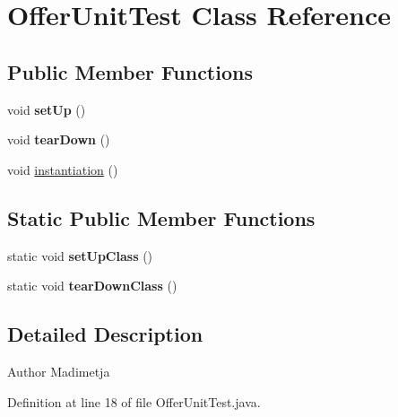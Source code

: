 \hypertarget{class_offer_unit_test}{\section{Offer\+Unit\+Test Class Reference}
\label{class_offer_unit_test}
}
\subsection*{Public Member Functions}
\begin{DoxyCompactItemize}
\item 
\hypertarget{class_offer_unit_test_a491087ff4d8fd6bad517f3e65c6a2c1a}{void {\bfseries set\+Up} ()}\label{class_offer_unit_test_a491087ff4d8fd6bad517f3e65c6a2c1a}

\item 
\hypertarget{class_offer_unit_test_a8e3f348a59b90790bb602bafbe7e2c0d}{void {\bfseries tear\+Down} ()}\label{class_offer_unit_test_a8e3f348a59b90790bb602bafbe7e2c0d}

\item 
void \hyperlink{class_offer_unit_test_a6a183dfb778383f20231c0dd4a43dc65}{instantiation} ()
\end{DoxyCompactItemize}
\subsection*{Static Public Member Functions}
\begin{DoxyCompactItemize}
\item 
\hypertarget{class_offer_unit_test_a814f87470fbd7747577a8d21a1e31374}{static void {\bfseries set\+Up\+Class} ()}\label{class_offer_unit_test_a814f87470fbd7747577a8d21a1e31374}

\item 
\hypertarget{class_offer_unit_test_afcf0203b47fec4b0899c2e53f2a1a4dc}{static void {\bfseries tear\+Down\+Class} ()}\label{class_offer_unit_test_afcf0203b47fec4b0899c2e53f2a1a4dc}

\end{DoxyCompactItemize}


\subsection{Detailed Description}
\begin{DoxyAuthor}{Author}
Madimetja 
\end{DoxyAuthor}


Definition at line 18 of file Offer\+Unit\+Test.\+java.



